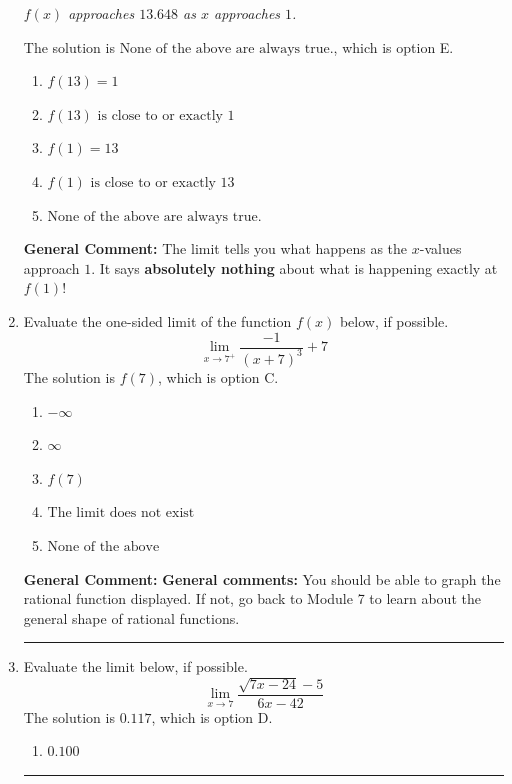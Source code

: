 \documentclass{extbook}[14pt]
\newcommand{\litem}[1]{\item #1

\rule{\textwidth}{0.4pt}}
\begin{document}
\begin{enumerate}
{\begin{center}
    \textit{ $f(x)$ approaches $13.648$ as $x$ approaches $1$. }
\end{center}
The solution is \( \text{None of the above are always true.} \), which is option E.\begin{enumerate}[label=\Alph*.]
\item \( f(13) = 1 \)


\item \( f(13) \text{ is close to or exactly } 1 \)


\item \( f(1) = 13 \)


\item \( f(1) \text{ is close to or exactly } 13 \)


\item \( \text{None of the above are always true.} \)


\end{enumerate}

\textbf{General Comment:} The limit tells you what happens as the $x$-values approach $1$. It says \textbf{absolutely nothing} about what is happening exactly at $f(1)$!
}
\litem{
Evaluate the one-sided limit of the function $f(x)$ below, if possible.
\[ \lim_{x \rightarrow 7^+} \frac{-1}{(x+7)^3}+7 \]The solution is \( f(7) \), which is option C.\begin{enumerate}[label=\Alph*.]
\item \( -\infty \)


\item \( \infty \)


\item \( f(7) \)


\item \( \text{The limit does not exist} \)


\item \( \text{None of the above} \)


\end{enumerate}

\textbf{General Comment:} \textbf{General comments:} You should be able to graph the rational function displayed. If not, go back to Module 7 to learn about the general shape of rational functions.
}
\litem{
Evaluate the limit below, if possible.
\[ \lim_{x \rightarrow 7} \frac{\sqrt{7x - 24} - 5}{6x - 42} \]The solution is \( 0.117 \), which is option D.\begin{enumerate}[label=\Alph*.]
\item \( 0.100 \)


\end{enumerate}}
\end{enumerate}
\end{document}
